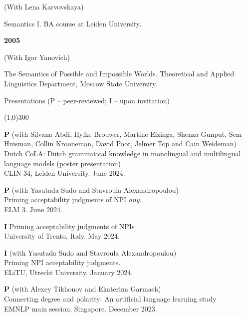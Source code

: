 \documentclass[12pt,letterpaper]{article}
\begin{document}
{{(With Lena Karvovskaya)

Semantics I. BA course at Leiden University.
}

\vspace{2mm}

\small{
\noindent\textbf{2005}

(With Igor Yanovich)

The Semantics of Possible and Impossible Worlds. Theoretical and Applied Linguistics Department, Moscow State University.
}

\vspace{6mm}

\noindent \Large{Presentations} \normalsize{(P -- peer-reviewed; I -- upon invitation)}

\vspace{-2mm}
\noindent\line(1,0){300}

\begin{hangparas}{.25in}{1} 

\textbf{P} \hspace{2.5mm}  (with Silvana Abdi, Hylke Brouwer, Martine Elzinga, Shenza Gunput, Sem Huisman, Collin Krooneman, David Poot, Jelmer Top and Cain Weideman)\\
Dutch CoLA: Dutch grammatical knowledge in monolingual and multilingual language models (poster presentation)\\
CLIN 34, Leiden University. June 2024.

\textbf{P} \hspace{2.5mm}  (with Yasutada Sudo and Stavroula Alexandropoulou)\\
Priming acceptability judgments of NPI {\it any}.\\
ELM 3. June 2024.

\textbf{I} \hspace{2.5mm}  Priming acceptability judgments of NPIs\\
University of Trento, Italy. May 2024.

\textbf{I} \hspace{2.5mm}  (with Yasutada Sudo and Stavroula Alexandropoulou)\\
Priming NPI acceptability judgments.\\
ELiTU, Utrecht University. January 2024. 

\textbf{P} \hspace{2.5mm}  (with Alexey Tikhonov and Ekaterina Garmash)\\
Connecting degree and polarity: An artificial language learning study\\
EMNLP main session, Singapore. December 2023.


\end{hangparas}}
\end{document}
